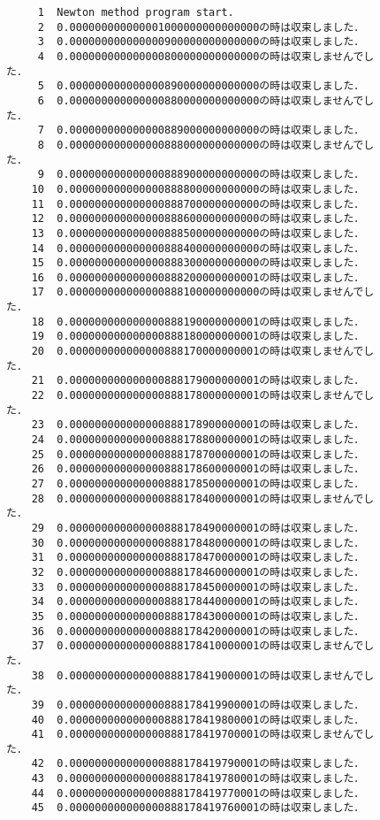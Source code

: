 \documentclass[12pt]{jarticle}
\renewcommand  \[  {\begin{eqnarray}}
\renewcommand  \]  {\end{eqnarray}}
\begin{document}
\begin{figure}[t]
\begin{screen}
\small
\begin{verbatim}
     1	Newton method program start.
     2	0.000000000000001000000000000000の時は収束しました．
     3	0.000000000000000900000000000000の時は収束しました．
     4	0.000000000000000800000000000000の時は収束しませんでした．
     5	0.000000000000000890000000000000の時は収束しました．
     6	0.000000000000000880000000000000の時は収束しませんでした．
     7	0.000000000000000889000000000000の時は収束しました．
     8	0.000000000000000888000000000000の時は収束しませんでした．
     9	0.000000000000000888900000000000の時は収束しました．
    10	0.000000000000000888800000000000の時は収束しました．
    11	0.000000000000000888700000000000の時は収束しました．
    12	0.000000000000000888600000000000の時は収束しました．
    13	0.000000000000000888500000000000の時は収束しました．
    14	0.000000000000000888400000000000の時は収束しました．
    15	0.000000000000000888300000000000の時は収束しました．
    16	0.000000000000000888200000000001の時は収束しました．
    17	0.000000000000000888100000000000の時は収束しませんでした．
    18	0.000000000000000888190000000001の時は収束しました．
    19	0.000000000000000888180000000001の時は収束しました．
    20	0.000000000000000888170000000001の時は収束しませんでした．
    21	0.000000000000000888179000000001の時は収束しました．
    22	0.000000000000000888178000000001の時は収束しませんでした．
    23	0.000000000000000888178900000001の時は収束しました．
    24	0.000000000000000888178800000001の時は収束しました．
    25	0.000000000000000888178700000001の時は収束しました．
    26	0.000000000000000888178600000001の時は収束しました．
    27	0.000000000000000888178500000001の時は収束しました．
    28	0.000000000000000888178400000001の時は収束しませんでした．
    29	0.000000000000000888178490000001の時は収束しました．
    30	0.000000000000000888178480000001の時は収束しました．
    31	0.000000000000000888178470000001の時は収束しました．
    32	0.000000000000000888178460000001の時は収束しました．
    33	0.000000000000000888178450000001の時は収束しました．
    34	0.000000000000000888178440000001の時は収束しました．
    35	0.000000000000000888178430000001の時は収束しました．
    36	0.000000000000000888178420000001の時は収束しました．
    37	0.000000000000000888178410000001の時は収束しませんでした．
    38	0.000000000000000888178419000001の時は収束しませんでした．
    39	0.000000000000000888178419900001の時は収束しました．
    40	0.000000000000000888178419800001の時は収束しました．
    41	0.000000000000000888178419700001の時は収束しませんでした．
    42	0.000000000000000888178419790001の時は収束しました．
    43	0.000000000000000888178419780001の時は収束しました．
    44	0.000000000000000888178419770001の時は収束しました．
    45	0.000000000000000888178419760001の時は収束しました．
\end{verbatim}
\end{screen}
\end{figure}
\end{document}

